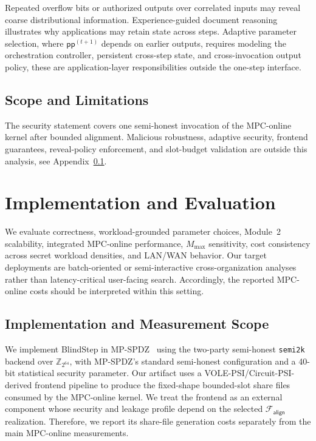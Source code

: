 \documentclass[conference,compsoc,letterpaper]{IEEEtran}
\theoremstyle{definition}
\theoremstyle{remark}
\newcommand{\BlindStep}{BlindStep\xspace}
\newcommand{\Falign}{\mathcal{F}_{\mathsf{align}}}
\newcommand{\pp}{\mathsf{pp}}
\newcommand{\Mmax}{M_{\max}}
\begin{document}
Repeated overflow bits or authorized outputs over correlated inputs may reveal coarse distributional information.
Experience-guided document reasoning~\cite{zai2026trace} illustrates why applications may retain state across steps.
Adaptive parameter selection, where $\pp^{(t+1)}$ depends on earlier outputs, requires modeling the orchestration controller, persistent cross-step state, and cross-invocation output policy, these are application-layer responsibilities outside the one-step interface.

\subsection{Scope and Limitations}
\label{app:limitations}

The security statement covers one semi-honest invocation of the
MPC-online kernel after bounded alignment. Malicious robustness,
adaptive security, frontend guarantees, reveal-policy enforcement, and
slot-budget validation are outside this analysis, see
Appendix~\ref{app:limitations}.
\section{Implementation and Evaluation}
\label{sec:evaluation}

We evaluate correctness, workload-grounded parameter choices, Module~2 scalability, integrated MPC-online performance, $\Mmax$ sensitivity, cost consistency across secret workload densities, and LAN/WAN behavior.
Our target deployments are batch-oriented or semi-interactive cross-organization analyses rather than latency-critical user-facing search.
Accordingly, the reported MPC-online costs should be interpreted within this setting.

\subsection{Implementation and Measurement Scope}
\label{subsec:impl}

We implement \BlindStep{} in MP-SPDZ~\cite{keller2020mp} using the
two-party semi-honest \texttt{semi2k} backend over
$\mathbb{Z}_{2^{64}}$, with MP-SPDZ's standard semi-honest
configuration and a 40-bit statistical security parameter.
Our artifact uses a VOLE-PSI/Circuit-PSI-derived frontend pipeline to
produce the fixed-shape bounded-slot share files consumed by the
MPC-online kernel.
We treat the frontend as an external component whose security and leakage profile depend on the selected $\Falign{}$ realization.
Therefore, we report its share-file generation costs separately from the main MPC-online measurements.
\end{document}
